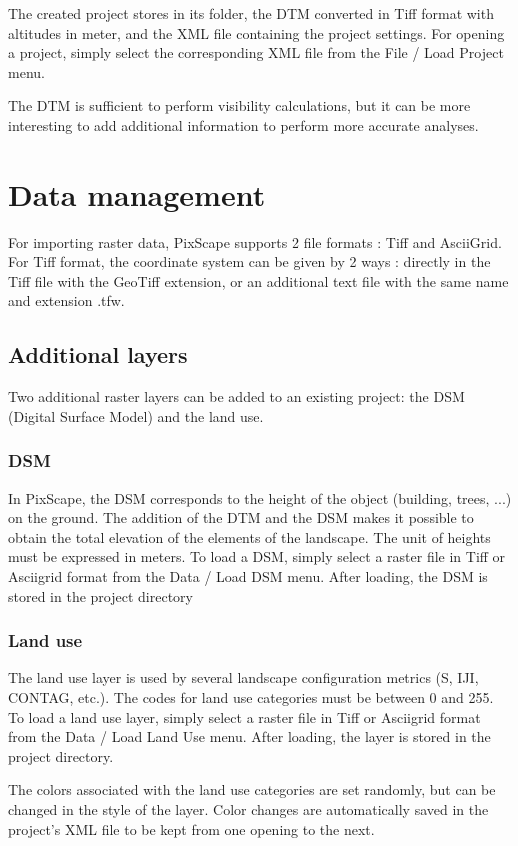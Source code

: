 \documentclass{report}
\begin{document}
The created project stores in its folder, the DTM converted in Tiff format with altitudes in meter, and the XML file containing the project settings.
For opening a project, simply select the corresponding XML file from the File / Load Project menu.

The DTM is sufficient to perform visibility calculations, but it can be more interesting to add additional information to perform more accurate analyses.

\section{Data management}

For importing raster data, PixScape supports 2 file formats : Tiff and AsciiGrid.
For Tiff format, the coordinate system can be given by 2 ways : directly in the Tiff file with the GeoTiff extension, or an additional text file with the same name and extension .tfw.


\subsection{Additional layers}
Two additional raster layers can be added to an existing project: the DSM (Digital Surface Model) and the land use.

\subsubsection{DSM}
In PixScape, the DSM corresponds to the height of the object (building, trees, ...) on the ground. The addition of the DTM and the DSM makes it possible to obtain the total elevation of the elements of the landscape. 
The unit of heights must be expressed in meters. To load a DSM, simply select a raster file in Tiff or Asciigrid format from the Data / Load DSM menu. After loading, the DSM is stored in the project directory

\subsubsection{Land use}
The land use layer is used by several landscape configuration metrics (S, IJI, CONTAG, etc.). The codes for land use categories must be between 0 and 255. To load a land use layer, simply select a raster file in Tiff or Asciigrid format from the Data / Load Land Use menu. After loading, the layer is stored in the project directory.

The colors associated with the land use categories are set randomly, but can be changed in the style of the layer. Color changes are automatically saved in the project's XML file to be kept from one opening to the next.
\end{document}
